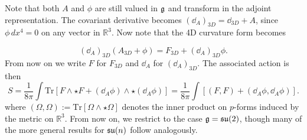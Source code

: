 	Note that both $A$ and $\phi$ are still valued in $\frak g$ and transform in the adjoint representation. The covariant derivative becomes $(\dd_A)_{3D} = \dd_{3D} + A$, since $\phi\, dx^4 = 0$ on any vector in $\mathbb R^3$. Now note that the 4D curvature form becomes
%
	
	
	
	\begin{equation}
		(\dd_A)_{3D}(A_{3D} + \phi) = F_{3D} + (\dd_A)_{3D} \phi.
	\end{equation}
	From now on we write $F$ for $F_{3D}$ and $\dd_A$ for $(\dd_A)_{3D}$. The associated action is then
	\begin{equation}
		S = \frac{1}{8\pi} \int \mathrm{Tr} \left[F \wedge \star F + (\dd_A \phi) \wedge \star (\dd_A \phi)\right] = \frac{1}{8\pi} \int \left[(F,F) + (\dd_A \phi,\dd_A \phi)\right].
	\end{equation}
	where $(\Omega, \Omega) := \mathrm{Tr} [\Omega \wedge \star \Omega]$ denotes the inner product on $p$-forms induced by the metric on $\mathbb R^3$. From now on, we restrict to the case $\frak g = \frak{su}(2)$, though many of the more general results for $\frak{su}(n)$ follow analogously.
	
